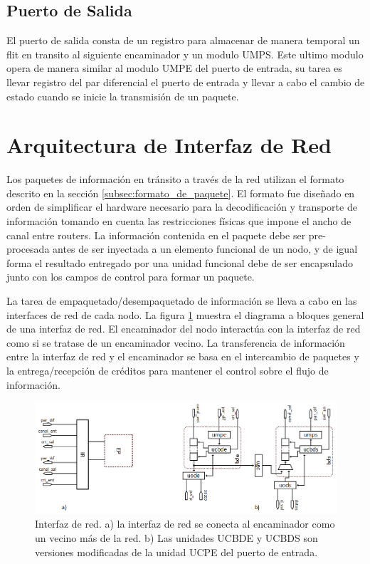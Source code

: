 \subsection{Puerto de Salida}
	\label{Puerto_salida}

El puerto de salida consta de un registro para almacenar de manera temporal un flit en transito al siguiente encaminador y un modulo UMPS. Este ultimo modulo opera de manera similar al modulo UMPE del puerto de entrada, su tarea es llevar registro del par diferencial el puerto de entrada y llevar a cabo el cambio de estado cuando se inicie la transmisión de un paquete.








\section{Arquitectura de Interfaz de Red}
	\label{sec:arq_ir}

Los paquetes de información en tránsito a través de la red utilizan el formato descrito en la sección \ref{subsec:formato_de_paquete}. El formato fue diseñado en orden de simplificar el hardware necesario para la decodificación y transporte de información tomando en cuenta las restricciones físicas que impone el ancho de canal entre routers. La información contenida en el paquete debe ser pre-procesada antes de ser inyectada a un elemento funcional de un nodo, y de igual forma el resultado entregado por una unidad funcional debe de ser encapsulado junto con los campos de control para formar un paquete.

La tarea de empaquetado/desempaquetado de información se lleva a cabo en las interfaces de red de cada nodo. La figura \ref{fig:ch4_interfaz_de_red_top} muestra el diagrama a bloques general de una interfaz de red. El encaminador del nodo interactúa con la interfaz de red como si se tratase de un encaminador vecino. La transferencia de información entre la interfaz de red y el encaminador se basa en el intercambio de paquetes y la entrega/recepción de créditos para mantener el control sobre el flujo de información.


\begin{figure}
	\begin{center}
		\includegraphics[width=\linewidth]{figures/ch4_interfaz_de_red_top.png}
	\end{center}
	\caption
		{	
			Interfaz de red. a) la interfaz de red se conecta al encaminador como un vecino más de la red. b) Las unidades UCBDE y UCBDS son versiones modificadas de la unidad UCPE del puerto de entrada.
		}
	\label{fig:ch4_interfaz_de_red_top}
\end{figure}



